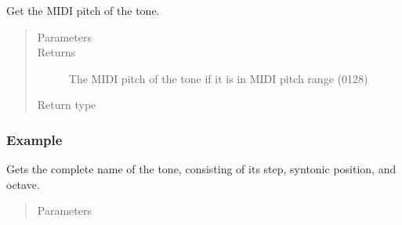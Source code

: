 \documentclass[letterpaper,10pt,english]{sphinxmanual}
\begin{document}
\begin{fulllineitems}

\begin{fulllineitems}
\label{\detokenize{api:musictheory.Tone.get_midi_pitch}}
Get the MIDI pitch of the tone.
\begin{quote}\begin{description}
\item[{Parameters}] \leavevmode
{} \textendash{} 

\item[{Returns}] \leavevmode
The MIDI pitch of the tone if it is in MIDI pitch range (0\textendash{}128)

\item[{Return type}] \leavevmode
{}

\end{description}\end{quote}
\subsubsection*{Example}

\begin{sphinxVerbatim}[commandchars=\\\{\}]
  
\end{sphinxVerbatim}

\end{fulllineitems}


\begin{fulllineitems}
\label{\detokenize{api:musictheory.Tone.get_name}}
Gets the complete name of the tone, consisting of its step, syntonic position, and octave.
\begin{quote}\begin{description}
\item[{Parameters}] \leavevmode
{} \textendash{} 


\end{description}
\end{quote}
\end{fulllineitems}
\end{fulllineitems}
\end{document}
